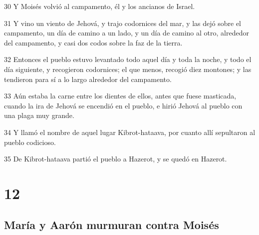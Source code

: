 \par 30 Y Moisés volvió al campamento, él y los ancianos de Israel.
\par 31 Y vino un viento de Jehová, y trajo codornices del mar, y las dejó sobre el campamento, un día de camino a un lado, y un día de camino al otro, alrededor del campamento, y casi dos codos   sobre la faz de la tierra. 
\par 32 Entonces el pueblo estuvo levantado todo aquel día y toda la noche, y todo el día siguiente, y recogieron codornices; el que menos, recogió diez montones; y las tendieron para sí a lo largo alrededor del campamento.
\par 33 Aún estaba la carne entre los dientes de ellos, antes que fuese masticada, cuando la ira de Jehová se encendió en el pueblo, e hirió Jehová al pueblo con una plaga muy grande.
\par 34 Y llamó el nombre de aquel lugar Kibrot-hataava, por cuanto allí sepultaron al pueblo codicioso.
\par 35 De Kibrot-hataava partió el pueblo a Hazerot, y se quedó en Hazerot.

\chapter{12}

\section*{María y Aarón murmuran contra Moisés}

